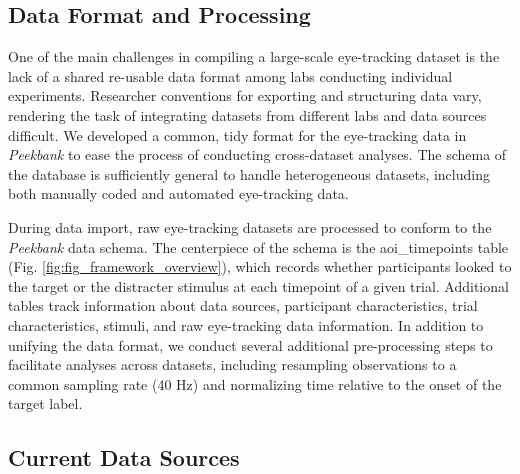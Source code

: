\documentclass[10pt, letterpaper]{article}
\begin{document}
\hypertarget{data-format-and-processing}{%
\subsection{Data Format and
Processing}\label{data-format-and-processing}}

One of the main challenges in compiling a large-scale eye-tracking
dataset is the lack of a shared re-usable data format among labs
conducting individual experiments. Researcher conventions for exporting
and structuring data vary, rendering the task of integrating datasets
from different labs and data sources difficult. We developed a common,
tidy format for the eye-tracking data in \emph{Peekbank} to ease the
process of conducting cross-dataset analyses. The schema of the database
is sufficiently general to handle heterogeneous datasets, including both
manually coded and automated eye-tracking data.

During data import, raw eye-tracking datasets are processed to conform
to the \emph{Peekbank} data schema. The centerpiece of the schema is the
aoi\_timepoints table (Fig. \ref{fig:fig_framework_overview}), which
records whether participants looked to the target or the distracter
stimulus at each timepoint of a given trial. Additional tables track
information about data sources, participant characteristics, trial
characteristics, stimuli, and raw eye-tracking data information. In
addition to unifying the data format, we conduct several additional
pre-processing steps to facilitate analyses across datasets, including
resampling observations to a common sampling rate (40 Hz) and
normalizing time relative to the onset of the target label.

\hypertarget{current-data-sources}{%
\subsection{Current Data Sources}\label{current-data-sources}}
\end{document}
